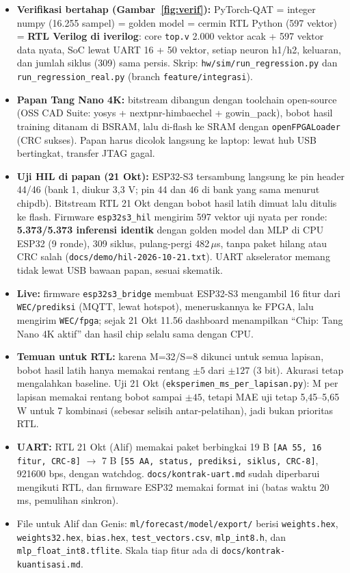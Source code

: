 \documentclass[10.5pt,a4paper]{article}
\newcommand{\cmd}[1]{\texttt{#1}}
\begin{document}
\begin{itemize}
  \item \textbf{Verifikasi bertahap (Gambar~\ref{fig:verif}):} PyTorch-QAT = integer numpy (16.255 sampel) = golden model = cermin RTL Python (597 vektor)
        = \textbf{RTL Verilog di iverilog}: core \cmd{top.v} 2.000 vektor acak + 597 vektor data nyata, SoC lewat UART 16 + 50 vektor, setiap neuron
        h1/h2, keluaran, dan jumlah siklus (309) sama persis. Skrip: \cmd{hw/sim/run\_regression.py} dan \cmd{run\_regression\_real.py} (branch \cmd{feature/integrasi}).
  \item \textbf{Papan Tang Nano 4K:} bitstream dibangun dengan toolchain open-source (OSS CAD Suite: yosys + nextpnr-himbaechel + gowin\_pack),
        bobot hasil training ditanam di BSRAM, lalu di-flash ke SRAM dengan \cmd{openFPGALoader} (CRC sukses). Papan harus dicolok langsung ke laptop:
        lewat hub USB bertingkat, transfer JTAG gagal.
  \item \textbf{Uji HIL di papan (21 Okt):} ESP32-S3 tersambung langsung ke pin header 44/46 (bank 1, diukur 3,3 V; pin 44 dan 46 di bank yang sama menurut chipdb).
        Bitstream RTL 21 Okt dengan bobot hasil latih dimuat lalu ditulis ke flash. Firmware \cmd{esp32s3\_hil} mengirim 597 vektor uji nyata per ronde:
        \textbf{5.373/5.373 inferensi identik} dengan golden model dan MLP di CPU ESP32 (9 ronde), 309 siklus, pulang-pergi 482\,$\mu$s, tanpa paket hilang atau CRC salah
        (\cmd{docs/demo/hil-2026-10-21.txt}). UART akselerator memang tidak lewat USB bawaan papan, sesuai skematik.
  \item \textbf{Live:} firmware \cmd{esp32s3\_bridge} membuat ESP32-S3 mengambil 16 fitur dari \cmd{WEC/prediksi} (MQTT, lewat hotspot), meneruskannya ke FPGA, lalu mengirim \cmd{WEC/fpga};
        sejak 21 Okt 11.56 dashboard menampilkan ``Chip: Tang Nano 4K aktif'' dan hasil chip selalu sama dengan CPU.
  \item \textbf{Temuan untuk RTL:} karena M=32/S=8 dikunci untuk semua lapisan, bobot hasil latih hanya memakai rentang $\pm5$ dari $\pm127$ (3 bit).
        Akurasi tetap mengalahkan baseline. Uji 21 Okt (\cmd{eksperimen\_ms\_per\_lapisan.py}): M per lapisan memakai rentang bobot sampai $\pm45$, tetapi MAE uji tetap 5,45--5,65 W untuk 7 kombinasi (sebesar selisih antar-pelatihan), jadi bukan prioritas RTL.
  \item \textbf{UART:} RTL 21 Okt (Alif) memakai paket berbingkai 19 B \cmd{[AA 55, 16 fitur, CRC-8]} $\to$ 7 B \cmd{[55 AA, status, prediksi, siklus, CRC-8]}, 921600 bps, dengan watchdog. \cmd{docs/kontrak-uart.md} sudah diperbarui mengikuti RTL, dan firmware ESP32 memakai format ini (batas waktu 20 ms, pemulihan sinkron).
  \item File untuk Alif dan Genis: \cmd{ml/forecast/model/export/} berisi \cmd{weights.hex}, \cmd{weights32.hex}, \cmd{bias.hex}, \cmd{test\_vectors.csv},
        \cmd{mlp\_int8.h}, dan \cmd{mlp\_float\_int8.tflite}. Skala tiap fitur ada di \cmd{docs/kontrak-kuantisasi.md}.
\end{itemize}
\end{document}
